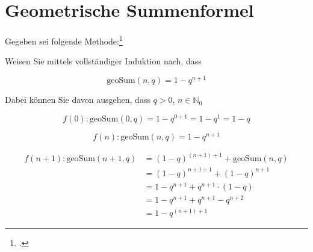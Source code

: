 \documentclass{lehramt-informatik-aufgabe}
\begin{document}
\def\m#1{\textcolor{blue}{#1}}

\section{Geometrische Summenformel}

Gegeben sei folgende Methode:\footcite{sosy:e-klausur}


\noindent
Weisen Sie mittels vollständiger Induktion nach, dass

\begin{displaymath}
\text{geoSum}(n,q) = 1 - q^{n+1}
\end{displaymath}

\noindent
Dabei können Sie davon ausgehen, dass $q > 0$, $ n \in \mathbb{N}_0$




\begin{liAntwort}
\liInduktionAnfang

\begin{displaymath}
f(0): \text{geoSum}(0, q) = 1 - q^{0+1} = 1 - q^1 = 1 - q
\end{displaymath}

\liInduktionVoraussetzung

\begin{displaymath}
f(n): \text{geoSum}(n, q) = 1 - q^{n+1}
\end{displaymath}

\liInduktionSchritt

\begin{align*}
f(n+1): \text{geoSum}(n + 1, q)
& = (1 - q)^{(n + 1) + 1} + \text{geoSum}(n, q) \\
& = (1 - q)^{n + 1 + 1} + (1 - q)^{n + 1} \\
& = 1 - q^{n + 1} + q^{n + 1} \cdot (1 - q) \\
& = 1 - q^{n + 1} + q^{n + 1} - q^{n + 2} \\
& = 1 - q^{(n + 1) + 1}
\end{align*}
\end{liAntwort}
\end{document}
